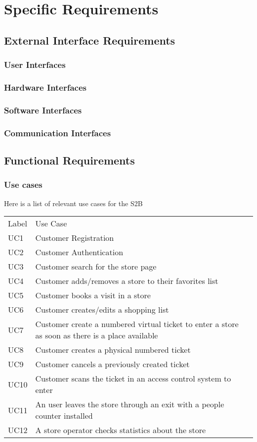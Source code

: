 \section{Specific Requirements}

\subsection{External Interface Requirements}
\subsubsection{User Interfaces}
\subsubsection{Hardware Interfaces}
\subsubsection{Software Interfaces}
\subsubsection{Communication Interfaces}
\subsection{Functional Requirements}
\subsubsection{Use cases}
    Here is a list of relevant use cases for the S2B
    \smallskip
    
    \renewcommand{\arraystretch}{1.4}
    \begin{tabular}{C{2cm}L{10.5cm}C{2.6cm}}
        Label & Use Case       \\
        UC1 & Customer Registration \\
        UC2 & Customer Authentication \\
        UC3 & Customer search for the store page\\
        UC4 & Customer adds/removes a store to their favorites list\\
        UC5 & Customer books a visit in a store \\
        UC6 & Customer creates/edits a shopping list \\
        UC7 & Customer create a numbered virtual ticket to enter a store as soon as there is a place available \\
        UC8 & Customer creates a physical numbered ticket \\
        UC9 & Customer cancels a previously created ticket \\
        UC10 & Customer scans the ticket in an access control system to enter \\
        UC11 & An user leaves the store through an exit with a people counter installed \\
        UC12 & A store operator checks statistics about the store\\

    \end{tabular}
    

